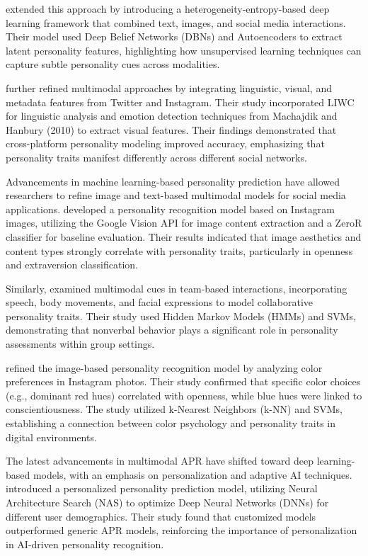 \citet{Xianyu2016} extended this approach by introducing a heterogeneity-entropy-based deep learning framework that combined text, images, and social media interactions. Their model used Deep Belief Networks (DBNs) and Autoencoders to extract latent personality features, highlighting how unsupervised learning techniques can capture subtle personality cues across modalities.

\citet{Skowron2016} further refined multimodal approaches by integrating linguistic, visual, and metadata features from Twitter and Instagram. Their study incorporated LIWC for linguistic analysis and emotion detection techniques from Machajdik and Hanbury (2010) to extract visual features. Their findings demonstrated that cross-platform personality modeling improved accuracy, emphasizing that personality traits manifest differently across different social networks.

Advancements in machine learning-based personality prediction have allowed researchers to refine image and text-based multimodal models for social media applications. \citet{Ferwerda2018} developed a personality recognition model based on Instagram images, utilizing the Google Vision API for image content extraction and a ZeroR classifier for baseline evaluation. Their results indicated that image aesthetics and content types strongly correlate with personality traits, particularly in openness and extraversion classification.

Similarly, \citet{Batrinca2016} examined multimodal cues in team-based interactions, incorporating speech, body movements, and facial expressions to model collaborative personality traits. Their study used Hidden Markov Models (HMMs) and SVMs, demonstrating that nonverbal behavior plays a significant role in personality assessments within group settings.

\citet{Branz2020} refined the image-based personality recognition model by analyzing color preferences in Instagram photos. Their study confirmed that specific color choices (e.g., dominant red hues) correlated with openness, while blue hues were linked to conscientiousness. The study utilized k-Nearest Neighbors (k-NN) and SVMs, establishing a connection between color psychology and personality traits in digital environments.

The latest advancements in multimodal APR have shifted toward deep learning-based models, with an emphasis on personalization and adaptive AI techniques. \citet{Salam2022} introduced a personalized personality prediction model, utilizing Neural Architecture Search (NAS) to optimize Deep Neural Networks (DNNs) for different user demographics. Their study found that customized models outperformed generic APR models, reinforcing the importance of personalization in AI-driven personality recognition.

